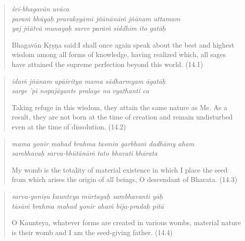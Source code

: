 \documentclass[12pt, twoside, openright]{memoir}
\begin{document}
\par
\begin{verse}
\textit{śrī-bhagavān uvāca} \\
\textit{paraṁ bhūyaḥ pravakṣyāmi jñānānāṁ jñānam uttamam} \\
\textit{yaj jñātvā munayaḥ sarve parāṁ siddhim ito gatāḥ}

\noindent \quad Bhagavān Kṛṣṇa said:\linebreak I shall once again speak about the best and highest wisdom among all forms of knowledge, having realized which, all sages have attained the supreme perfection beyond this world. (14.1)
\end{verse}
\par



\par
\begin{verse}
\textit{idaṁ jñānam upāśritya mama sādharmyam āgatāḥ} \\
\textit{sarge ’pi nopajāyante pralaye na vyathanti ca}

\noindent Taking refuge in this wisdom, they attain the same nature as Me. As a result, they are not born at the time of creation and remain undisturbed even at the time of dissolution. (14.2)
\end{verse}
\par



\par
\begin{verse}
\textit{mama yonir mahad brahma tasmin garbhaṁ dadhāmy aham} \\
\textit{sambhavaḥ sarva-bhūtānāṁ tato bhavati bhārata}

\noindent My womb is the totality of material existence in which I place the seed from which arises the origin of all beings, O descendant of Bharata. (14.3)
\end{verse}
\par



\par
\begin{verse}
\textit{sarva-yoniṣu kaunteya mūrtayaḥ sambhavanti yāḥ} \\
\textit{tāsāṁ brahma mahad yonir ahaṁ bīja-pradaḥ pitā}

\noindent O Kaunteya, whatever forms are created in various wombs, material nature is their womb and I am the seed-giving father. (14.4)
\end{verse}
\par
\end{document}
